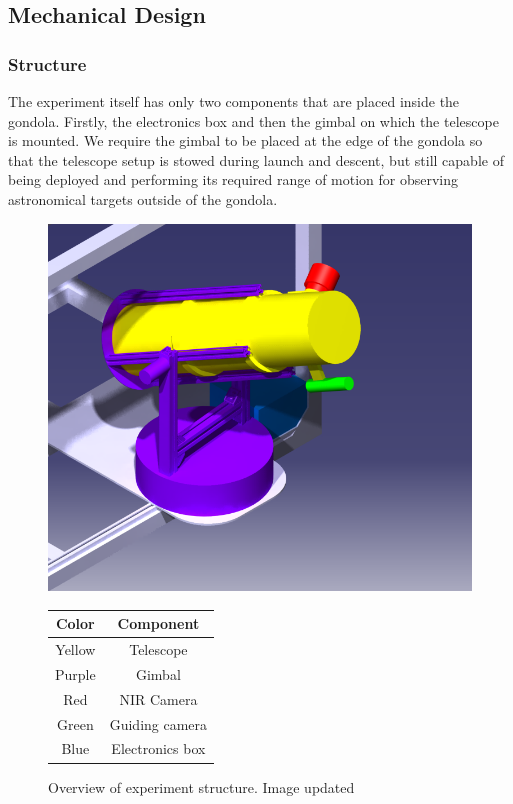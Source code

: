 \newpage
\subsection{Mechanical Design} \label{Mechanical_Design}
\label{sec:mechanical-design}

\subsubsection{Structure}
\label{sec:4.4.1}
The experiment itself has only two components that are placed inside the gondola. Firstly, the electronics box and then the gimbal on which the telescope is mounted. We require the gimbal to be placed at the edge of the gondola so that the telescope setup is stowed during launch and descent, but still capable of being deployed and performing its required range of motion for observing astronomical targets outside of the gondola.

\begin{figure}[H]
   \begin{minipage}[t]{0.6\textwidth}   
	\includegraphics[scale=1.4]{4-experiment-design/img/mechanical/Assembly_v3iso.png}
	\caption{Overview of experiment structure. Image updated}
	\label{fig::mechanical::IsoView1}
	\end{minipage}
	\hfill
	\begin{minipage}[t]{0.4\textwidth}
	\vspace{-5cm}	
	\begin{tabular}{c | c}
	Color & Component \\ \hline
	Yellow & Telescope\\
	Purple & Gimbal\\
	Red & NIR Camera\\
	Green & Guiding camera\\
	Blue & Electronics box\\	
	\end{tabular}	
\end{minipage}		 
\end{figure}


